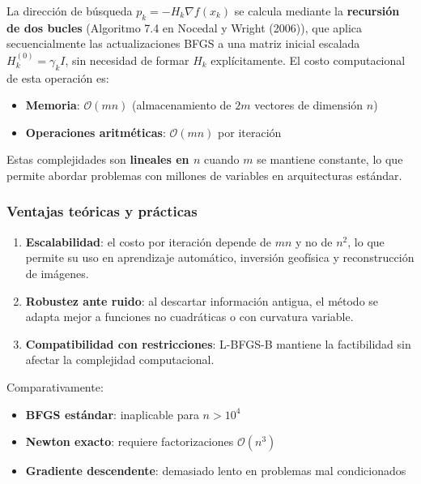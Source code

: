 \documentclass[
  spanish,
  us-letterpaper,
]{scrreprt}
\providecommand{\tightlist}{%
  \setlength{\itemsep}{0pt}\setlength{\parskip}{0pt}}
\numberwithin{equation}{section}
\begin{document}
La dirección de búsqueda \(p_k = -H_k \nabla f(x_k)\) se calcula
mediante la \textbf{recursión de dos bucles} (Algoritmo 7.4 en Nocedal y
Wright (2006)), que aplica secuencialmente las actualizaciones BFGS a
una matriz inicial escalada \(H_k^{(0)} = \gamma_k I\), sin necesidad de
formar \(H_k\) explícitamente. El costo computacional de esta operación
es:

\begin{itemize}
\tightlist
\item
  \textbf{Memoria}: \(\mathcal{O}(mn)\) (almacenamiento de \(2m\)
  vectores de dimensión \(n\))\\
\item
  \textbf{Operaciones aritméticas}: \(\mathcal{O}(mn)\) por iteración
\end{itemize}

Estas complejidades son \textbf{lineales en \(n\)} cuando \(m\) se
mantiene constante, lo que permite abordar problemas con millones de
variables en arquitecturas estándar.

\subsubsection{Ventajas teóricas y
prácticas}\label{ventajas-teuxf3ricas-y-pruxe1cticas}

\begin{enumerate}
\def\labelenumi{\arabic{enumi}.}
\tightlist
\item
  \textbf{Escalabilidad}: el costo por iteración depende de \(mn\) y no
  de \(n^2\), lo que permite su uso en aprendizaje automático, inversión
  geofísica y reconstrucción de imágenes.\\
\item
  \textbf{Robustez ante ruido}: al descartar información antigua, el
  método se adapta mejor a funciones no cuadráticas o con curvatura
  variable.\\
\item
  \textbf{Compatibilidad con restricciones}: L-BFGS-B mantiene la
  factibilidad sin afectar la complejidad computacional.
\end{enumerate}

Comparativamente:

\begin{itemize}
\tightlist
\item
  \textbf{BFGS estándar}: inaplicable para \(n > 10^4\)\\
\item
  \textbf{Newton exacto}: requiere factorizaciones
  \(\mathcal{O}(n^3)\)\\
\item
  \textbf{Gradiente descendente}: demasiado lento en problemas mal
  condicionados
\end{itemize}
\end{document}
